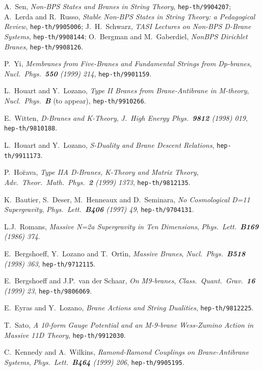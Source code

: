 \documentclass[12pt,a4paper]{article}
\begin{document}
\begin{thebibliography}{99}


A.~Sen, {\sl Non-BPS States and Branes in String Theory},
{\tt hep-th/9904207};
A.~Lerda and R.~Russo, {\sl Stable Non-BPS States in String Theory: 
a Pedagogical Review},
{\tt hep-th/9905006};
J.~H.~Schwarz, {\sl TASI Lectures on Non-BPS D-Brane Systems},
{\tt hep-th/9908144};
O.~Bergman and M.~Gaberdiel,
{\sl NonBPS Dirichlet Branes},
{\tt hep-th/9908126}.

P.~Yi, {\sl Membranes from Five-Branes and Fundamental Strings from 
Dp-branes},
{\it Nucl.~Phys.~{\bf 550} (1999) 214}, {\tt hep-th/9901159}.

L.~Houart and Y.~Lozano, {\sl Type II Branes from Brane-Antibrane
in M-theory}, {\it Nucl.~Phys.~{\bf B}} (to appear), {\tt hep-th/9910266}.





E.~Witten, {\sl D-Branes and K-Theory},
{\it J.~High Energy Phys.~{\bf 9812} (1998) 019},
{\tt hep-th/9810188}.

L.~Houart and Y.~Lozano, {\sl S-Duality and Brane Descent Relations},
{\tt hep-th/9911173}.


P.~Ho\u{r}ava, {\sl Type IIA D-Branes, K-Theory and Matrix Theory},
{\it Adv.~Theor.~Math.~Phys.~{\bf 2} (1999) 1373},
{\tt hep-th/9812135}.

K.~Bautier, S.~Deser, M.~Henneaux and D.~Seminara, {\sl No Cosmological
D=11 Supergravity}, {\it Phys.~Lett.~{\bf B406} (1997) 49},
{\tt hep-th/9704131}.

L.J.~Romans, {\sl Massive N=2a Supergravity in Ten Dimensions},
{\it Phys.~Lett.~{\bf B169} (1986) 374}.

E.~Bergshoeff, Y.~Lozano and T.~Ort\'{\i}n, {\sl Massive Branes},
{\it Nucl.~Phys.~{\bf B518} (1998) 363}, {\tt hep-th/9712115}.

E.~Bergshoeff and J.P.~van der Schaar, {\sl On M9-branes},
{\it Class.~Quant.~Grav.~{\bf 16} (1999) 23},
{\tt hep-th/9806069}.

E.~Eyras and Y.~Lozano, {\sl Brane Actions and String Dualities},
{\tt hep-th/9812225}.

T.~Sato, {\sl A 10-form Gauge Potential and an M-9-brane
Wess-Zumino Action in Massive 11D Theory}, {\tt hep-th/9912030}.


C.~Kennedy and A.~Wilkins, {\sl Ramond-Ramond Couplings on
Brane-Antibrane Systems}, 
{\it Phys.~Lett.~{\bf B464} (1999) 206},
{\tt hep-th/9905195}.



\end{thebibliography}
\end{document}
